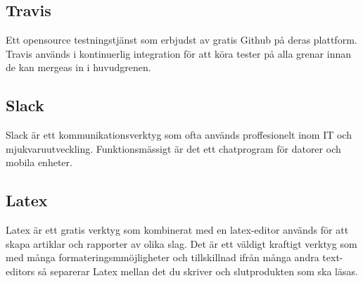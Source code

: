 \subsection*{Travis}
Ett opensource testningstjänst som erbjudst av gratis Github på deras plattform. Travis används i kontinuerlig integration för att köra tester på alla grenar innan de kan mergeas in i huvudgrenen.

\subsection*{Slack}
Slack är ett kommunikationsverktyg som ofta används proffesionelt inom IT och mjukvaruutveckling. Funktionsmässigt är det ett chatprogram för datorer och mobila enheter.

\subsection*{Latex}
Latex är ett gratis verktyg som kombinerat med en latex-editor används för att skapa artiklar och rapporter av olika slag. Det är ett väldigt kraftigt verktyg som med många formateringsmmöjligheter och tillskillnad ifrån många andra text-editors så separerar Latex mellan det du skriver och slutprodukten som ska läsas.
